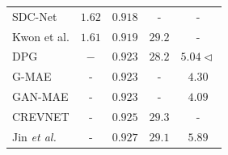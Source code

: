 \begin{table}[!t]
\begin{tabular} {@{}lcccc@{}}
		SDC-Net \cite{Reda2018} & $1.62$ & $0.918$ & - & -\\ %
		Kwon et al. \cite{Kwon2019} & $\mathbf{1.61}$ & $0.919$ & $29.2$ & -\\ %
		DPG \cite{Gao2019} & $-$ & $0.923$ & $28.2$ & $5.04\triangleleft$\\ %
		G-MAE \cite{Shouno2020} & - & $0.923$ & - & $4.30$ \\
		GAN-MAE \cite{Shouno2020} & - & $0.923$ & - & $4.09$ \\
		\ac{CREVNET} \cite{Yu2020} & - & $0.925$ & $\mathbf{29.3}$ & - \\
		Jin \textit{et al.}\cite{Jin2020} & - & $\mathbf{0.927}$ & $29.1$ & $5.89$ \\
		\bottomrule
	\end{tabular}
\end{table}

